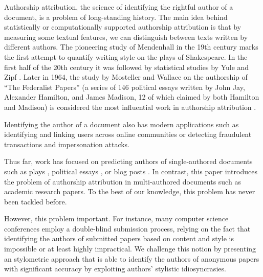
Authorship attribution, the science of identifying the rightful author of a document,
is a problem of long-standing history.
The main idea behind statistically or computationally supported authorship attribution is that by measuring some textual features, we can distinguish between texts written by different authors.
The pioneering study of Mendenhall \cite{mendenhall1887characteristic} in the 19th century marks the first attempt to quantify writing style on the plays of Shakespeare.
In the first half of the 20th century it was followed by statistical studies by Yule \cite{yule1939sentence,yule1944statistical} and Zipf \cite{zipf1932selected}. 
Later in 1964, the study by Mosteller and Wallace \cite{mosteller1964inference} on the authorship of ``The Federalist Papers'' (a series of 146 political essays written by John Jay, Alexander Hamilton, and James Madison, 12 of which claimed by both Hamilton and Madison) is considered the most influential work in authorship attribution \cite{stamatatos2009survey}. 

Identifying the author of a document also has modern applications such as identifying and linking users across online communities or detecting fraudulent transactions and impersonation attacks.

Thus far, work has focused on predicting authors of single-authored documents such as plays \cite{mendenhall1887characteristic,matthews1993neural,merriam1994neural}, political essays \cite{mosteller1964inference}, or blog posts \cite{narayanan2012feasibility}.
In contrast, this paper introduces the problem of authorship attribution in multi-authored documents such as academic research papers.
To the best of our knowledge, this problem has never been tackled before.

However, this problem important. 
For instance, many computer science conferences employ a double-blind submission process, relying on the fact that identifying the authors of submitted papers based on content and style is impossible or at least highly impractical. 
We challenge this notion by presenting an stylometric approach that is able to identify the authors of anonymous papers with significant accuracy by exploiting authors' stylistic idiosyncrasies.

